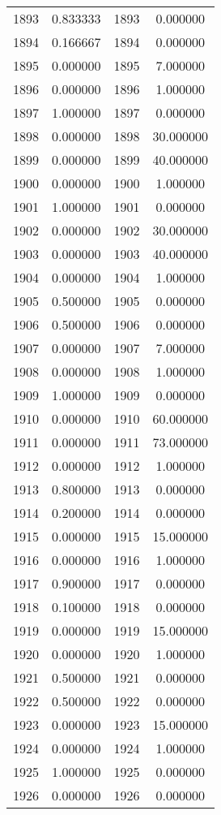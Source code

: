 \documentclass[12pt]{article}
\begin{document}
\begin{longtable}{@{}cccc@{}}
1893 & 0.833333 & 1893 & 0.000000 \\
1894 & 0.166667 & 1894 & 0.000000 \\
1895 & 0.000000 & 1895 & 7.000000 \\
1896 & 0.000000 & 1896 & 1.000000 \\
1897 & 1.000000 & 1897 & 0.000000 \\
1898 & 0.000000 & 1898 & 30.000000 \\
1899 & 0.000000 & 1899 & 40.000000 \\
1900 & 0.000000 & 1900 & 1.000000 \\
1901 & 1.000000 & 1901 & 0.000000 \\
1902 & 0.000000 & 1902 & 30.000000 \\
1903 & 0.000000 & 1903 & 40.000000 \\
1904 & 0.000000 & 1904 & 1.000000 \\
1905 & 0.500000 & 1905 & 0.000000 \\
1906 & 0.500000 & 1906 & 0.000000 \\
1907 & 0.000000 & 1907 & 7.000000 \\
1908 & 0.000000 & 1908 & 1.000000 \\
1909 & 1.000000 & 1909 & 0.000000 \\
1910 & 0.000000 & 1910 & 60.000000 \\
1911 & 0.000000 & 1911 & 73.000000 \\
1912 & 0.000000 & 1912 & 1.000000 \\
1913 & 0.800000 & 1913 & 0.000000 \\
1914 & 0.200000 & 1914 & 0.000000 \\
1915 & 0.000000 & 1915 & 15.000000 \\
1916 & 0.000000 & 1916 & 1.000000 \\
1917 & 0.900000 & 1917 & 0.000000 \\
1918 & 0.100000 & 1918 & 0.000000 \\
1919 & 0.000000 & 1919 & 15.000000 \\
1920 & 0.000000 & 1920 & 1.000000 \\
1921 & 0.500000 & 1921 & 0.000000 \\
1922 & 0.500000 & 1922 & 0.000000 \\
1923 & 0.000000 & 1923 & 15.000000 \\
1924 & 0.000000 & 1924 & 1.000000 \\
1925 & 1.000000 & 1925 & 0.000000 \\
1926 & 0.000000 & 1926 & 0.000000 \\

\end{longtable}
\end{document}
